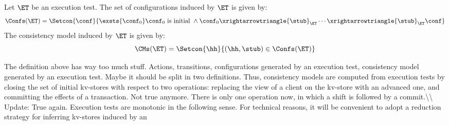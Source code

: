 \begin{definition}
\label{def:cm}
Let $\ET$ be an execution test.
The set of configurations induced by $\ET$ is given by:
\[
\Confs(\ET) = \Setcon{ \conf}{ \exsts{\conf_0} \conf_0 \text{ is initial } \wedge \conf_0 \xrightarrowtriangle{\stub}_{\ET} \cdots \xrightarrowtriangle{\stub}_{\ET} \conf }
\]
The consistency model induced by $\ET$ is given by:
\[ 
\CMs(\ET) = \Setcon{ \hh }{ (\hh, \stub) \in \Confs(\ET) }
\]
%
\end{definition}
\ac{The definition above has way too much stuff. Actions, transitions, configurations generated by an execution test, 
consistency model generated by an execution test. Maybe it should be split in two definitions.}
Thus, consistency models are computed from execution tests by closing the set of initial kv-stores with 
respect to two operations: replacing the view of a client on the kv-store with an advanced one, and committing 
the effects of a transaction. 
\ac{Not true anymore. There is only one operation now, in which a shift is followed by a commit.\\ Update: True again.}
Execution tests are monotonic in the following sense.
For technical reasons, it will be convenient to adopt a reduction strategy for inferring kv-stores induced by an 
